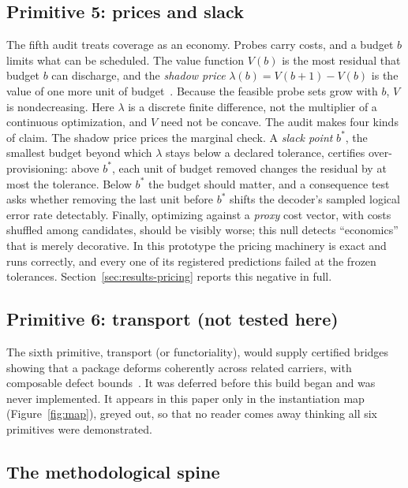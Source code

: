 \subsection{Primitive 5: prices and slack}
\label{sec:sbt-prices}

The fifth audit treats coverage as an economy. Probes carry costs, and a budget $b$ limits what can be scheduled. The value function $V(b)$ is the most residual that budget $b$ can discharge, and the \emph{shadow price} $\lambda(b) = V(b{+}1) - V(b)$ is the value of one more unit of budget~\cite{sbt-spend}. Because the feasible probe sets grow with $b$, $V$ is nondecreasing. Here $\lambda$ is a discrete finite difference, not the multiplier of a continuous optimization, and $V$ need not be concave. The audit makes four kinds of claim. The shadow price prices the marginal check. A \emph{slack point} $b^{*}$, the smallest budget beyond which $\lambda$ stays below a declared tolerance, certifies over-provisioning: above $b^{*}$, each unit of budget removed changes the residual by at most the tolerance. Below $b^{*}$ the budget should matter, and a consequence test asks whether removing the last unit before $b^{*}$ shifts the decoder's sampled logical error rate detectably. Finally, optimizing against a \emph{proxy} cost vector, with costs shuffled among candidates, should be visibly worse; this null detects ``economics'' that is merely decorative. In this prototype the pricing machinery is exact and runs correctly, and every one of its registered predictions failed at the frozen tolerances. Section~\ref{sec:results-pricing} reports this negative in full.

\subsection{Primitive 6: transport (not tested here)}
\label{sec:sbt-transport}

The sixth primitive, transport (or functoriality), would supply certified bridges showing that a package deforms coherently across related carriers, with composable defect bounds~\cite{sbt-nk}. It was deferred before this build began and was never implemented. It appears in this paper only in the instantiation map (Figure~\ref{fig:map}), greyed out, so that no reader comes away thinking all six primitives were demonstrated.

\subsection{The methodological spine}
\label{sec:sbt-method}

